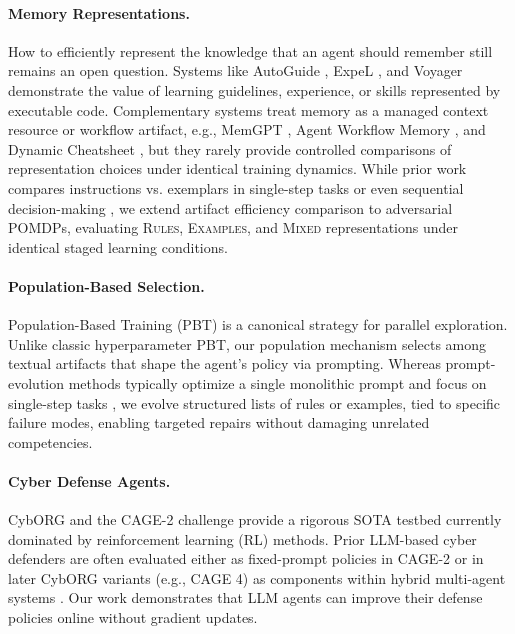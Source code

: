 \documentclass[sigconf]{acmart}
\begin{document}
\paragraph{Memory Representations.} How to efficiently represent the knowledge that an agent should remember still remains an open question. Systems like AutoGuide \citep{fu2024autoguide}, ExpeL \citep{zhao2024expel}, and Voyager \citep{wang2023voyager} demonstrate the value of learning guidelines, experience, or skills represented by executable code. Complementary systems treat memory as a managed context resource or workflow artifact, e.g., MemGPT \citep{packer2024memgpt}, Agent Workflow Memory \citep{wang2025awm}, and Dynamic Cheatsheet \citep{suzgun2025cheatsheet}, but they rarely provide controlled comparisons of representation choices under identical training dynamics. While prior work compares instructions vs. exemplars in single-step tasks \citep{wan2024teachbetter} or even sequential decision-making \citep{sarukkai2025self}, we extend artifact efficiency comparison to adversarial POMDPs, evaluating \textsc{Rules}, \textsc{Examples}, and \textsc{Mixed} representations under identical staged learning conditions.

\paragraph{Population-Based Selection.} Population-Based Training (PBT) \citep{jaderberg2017pbt} is a canonical strategy for parallel exploration. Unlike classic hyperparameter PBT, our population mechanism selects among textual artifacts that shape the agent's policy via prompting. Whereas prompt-evolution methods typically optimize a single monolithic prompt and focus on single-step tasks \citep{fernando2024promptbreeder,guo2024evoprompt,yang2024opro}, we evolve structured lists of rules or examples, tied to specific failure modes, enabling targeted repairs without damaging unrelated competencies.

\paragraph{Cyber Defense Agents.} CybORG \citep{standen2021cyborg} and the CAGE-2 challenge \citep{kiely2023autonomous} provide a rigorous SOTA testbed currently dominated by reinforcement learning (RL) methods. Prior LLM-based cyber defenders are often evaluated either as fixed-prompt policies in CAGE-2 \citep{mohammadi2025leveraging} or in later CybORG variants (e.g., CAGE 4) as components within hybrid multi-agent systems \citep{castro2025llmcyber}. Our work demonstrates that LLM agents can improve their defense policies online without gradient updates.
\end{document}
